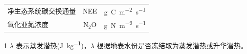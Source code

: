 {\begin{table}[htbp]
\begin{threeparttable}
\begin{tabular}{lcc}
        净生态系统碳交换通量   & NEE                         & \unit{g.C.m^{-2}.s^{-1}} \\
        氧化亚氮浓度           & $\mathrm{N_2O}$             & \unit{g.N.m^{-2}.s^{-1}} \\
        \bottomrule
      \end{tabular}
      \begin{tablenotes}
        \footnotesize
      \item[1] $\lambda$ 表示蒸发潜热(\unit{J.kg^{-1}})，$\lambda$ 根据地表水份是否冻结取为蒸发潜热或升华潜热。
      \end{tablenotes}
    \end{threeparttable}
  \end{table}
}
